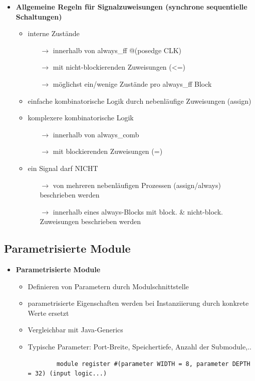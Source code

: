 \documentclass[11pt,a4paper]{article}
\begin{document}
\begin{itemize}
\begin{itemize}
	\end{itemize}
	
\item \textbf{Allgemeine Regeln für Signalzuweisungen (synchrone sequentielle Schaltungen)}
	\begin{itemize}
	\item interne Zustände
		\begin{itemize}
		\item[$\rightarrow$] innerhalb von always\_ff @(posedge CLK)
		\item[$\rightarrow$] mit nicht-blockierenden Zuweisungen (<=)
		\item[$\rightarrow$] möglichst ein/wenige Zustände pro always\_ff Block
		\end{itemize}
	\item einfache kombinatorische Logik durch nebenläufige Zuweisungen (assign)
	\item komplexere kombinatorische Logik
		\begin{itemize}
		\item[$\rightarrow$] innerhalb von always\_comb
		\item[$\rightarrow$] mit blockierenden Zuweisungen (=)
		\end{itemize}		
	\item ein Signal darf NICHT
		\begin{itemize}
		\item[$\rightarrow$] von mehreren nebenläufigen Prozessen (assign/always) beschrieben werden
		\item[$\rightarrow$] innerhalb eines always-Blocks mit block. \& nicht-block. Zuweisungen beschrieben werden
		\end{itemize}
			
	\end{itemize}

\end{itemize}

\subsection{Parametrisierte Module}
\begin{itemize}

\item \textbf{Parametrisierte Module}
	\begin{itemize}
	\item Definieren von Parametern durch Modulschnittstelle
	\item parametrisierte Eigenschaften werden bei Instanziierung durch konkrete Werte ersetzt
	\item Vergleichbar mit Java-Generics
	\item Typische Parameter: Port-Breite, Speichertiefe, Anzahl der Submodule,..
	\item[]
		\begin{lstlisting}
		module register #(parameter WIDTH = 8, parameter DEPTH = 32) (input logic...)
		\end{lstlisting}
	\end{itemize}

\end{itemize}
\end{document}
